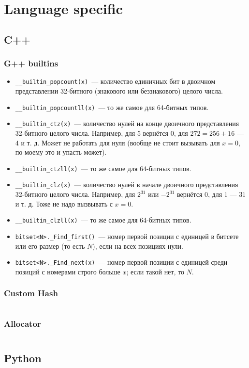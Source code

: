 \section{Language specific}

\subsection{C++}

\subsubsection{G++ builtins}

\begin{itemize}
	\item \texttt{__builtin_popcount(x)}~--- количество единичных бит в двоичном представлении 32-битного (знакового или беззнакового) целого числа.
	\item \texttt{__builtin_popcountll(x)}~--- то же самое для 64-битных типов.
	\item \texttt{__builtin_ctz(x)}~--- количество нулей на конце двоичного представления 32-битного целого числа. Например, для $5$ вернётся $0$, для $272 = 256 + 16$ --- $4$ и т. д. Может не работать для нуля (вообще не стоит вызывать для $x = 0$, по-моему это и упасть может).
	\item \texttt{__builtin_ctzll(x)}~--- то же самое для 64-битных типов.
	\item \texttt{__builtin_clz(x)}~--- количество нулей в начале двоичного представления 32-битного целого числа. Например, для $2^{31}$ или $-2^{31}$ вернётся
		$0$, для $1$ --- $31$ и т. д. Тоже не надо вызвывать с $x = 0$.
	\item \texttt{__builtin_clzll(x)}~--- то же самое для 64-битных типов.

	\item \texttt{bitset<N>._Find_first()}~--- номер первой позиции с единицей в битсете или его размер
		(то есть $N$), если на всех позициях нули.
	\item \texttt{bitset<N>._Find_next(x)}~--- номер первой позиции с единицей среди позиций с номерами строго больше $x$; если такой нет, то $N$.
\end{itemize}

\subsubsection{Custom Hash}

\inputminted{cpp}{\code/hacks.cpp}

\subsubsection{Allocator}

\inputminted{cpp}{\code/alloc.cpp}

\subsection{Python}

\inputminted{py3}{\code/python.py}
